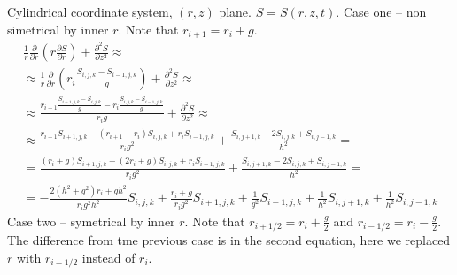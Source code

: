 \documentclass[a4paper,10pt]{article}
\begin{document}
Cylindrical coordinate system,  $(r,z)$ plane. $S = S(r, z, t)$.
Case one -- non simetrical by inner $r$.
Note that $r_{i+1} = r_i + g$.
\begin{multline}
    \frac{1}{r} \frac{\partial}{\partial r}
    \left( r \frac{\partial S}{\partial r} \right) +
    \frac{\partial^2 S}{\partial z^2}
    \approx
    \\%
    \approx
    \frac{1}{r}\frac{\partial}{\partial r}\left(r_i \frac{S_{i,j,k} - S_{i-1,j,k}}{g} \right) +
    \frac{\partial^2 S}{\partial z^2}
    \approx
    \\%
    \approx
    \frac{ r_{i+1}\frac{S_{i+1,j,k} - S_{i,j,k}}{g} - r_{i}\frac{S_{i,j,k} - S_{i-1,j,k}}{g}}{r_i g} +
    \frac{\partial^2 S}{\partial z^2}
    \approx
    \\%
    \approx
    \frac{ r_{i+1}S_{i+1,j,k} - (r_{i+1} + r_i)S_{i,j,k} + r_i S_{i-1,j,k} }{r_i g^2} +
    \frac{S_{i,j+1,k} - 2 S_{i,j,k} + S_{i,j-1,k}}{h^2}
    =
    \\%
    =
    \frac{ (r_i + g)S_{i+1,j,k} - (2 r_i + g)S_{i,j,k} + r_i S_{i-1,j,k} }{r_i g^2} +
    \frac{S_{i,j+1,k} - 2 S_{i,j,k} + S_{i,j-1,k}}{h^2}
    =
    \\%
    =
    -\frac{2 (h^2 + g^2) r_i + g h^2}{r_i g^2 h^2}  S_{i,j,k}
    +\frac{r_i + g}{r_i g^2}                        S_{i+1,j,k}
    +\frac{1}{g^2}                                  S_{i-1,j,k}
    +\frac{1}{h^2}                                  S_{i,j+1,k}
    +\frac{1}{h^2}                                  S_{i,j-1,k}
\end{multline}
Case two -- symetrical by inner $r$.
Note that $r_{i+1/2} = r_i + \frac{g}{2}$ and $r_{i-1/2} = r_i - \frac{g}{2}$.
The difference from tme previous case is in the second equation,
here we replaced $r$ with $r_{i-1/2}$ instead of $r_i$.
\end{document}
